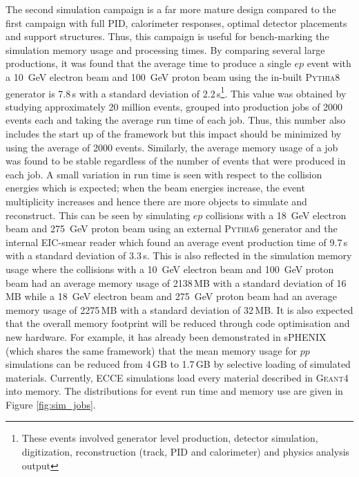 	The second simulation campaign is a far more mature design compared to the first campaign with full PID, calorimeter responses, optimal detector placements and support structures. Thus, this campaign is useful for bench-marking the simulation memory usage and processing times. By comparing several large productions, it was found that the average time to produce a single $ep$ event with a 10~GeV electron beam and 100~GeV proton beam using the in-built \textsc{Pythia8} generator is 7.8\,s with a standard deviation of 2.2\,s\footnote{These events involved generator level production, detector simulation, digitization, reconstruction (track, PID and calorimeter) and physics analysis output}. This value was obtained by studying approximately 20 million events, grouped into production jobs of 2000 events each and taking the average run time of each job. Thus, this number also includes the start up of the framework but this impact should be minimized by using the average of 2000 events. Similarly, the average memory usage of a job was found to be stable regardless of the number of events that were produced in each job. A small variation in run time is seen with respect to the collision energies which is expected; when the beam energies increase, the event multiplicity increases and hence there are more objects to simulate and reconstruct. This can be seen by simulating $ep$ collisions with a 18~GeV electron beam and 275~GeV proton beam using an external \textsc{Pythia6} generator and the internal EIC-smear reader which found an average event production time of 9.7\,s with a standard deviation of 3.3\,s. This is also reflected in the simulation memory usage where the collisions with a 10~GeV electron beam and 100~GeV proton beam had an average memory usage of 2138\,MB with a standard deviation of 16\,MB while a 18~GeV electron beam and 275~GeV proton beam had an average memory usage of 2275\,MB with a standard deviation of 32\,MB. It is also expected that the overall memory footprint will be reduced through code optimisation and new hardware. For example, it has already been demonstrated in sPHENIX (which shares the same framework) that the mean memory usage for $pp$ simulations can be reduced from 4\,GB to 1.7\,GB by selective loading of simulated materials. Currently, ECCE simulations load every material described in \textsc{Geant4} into memory. The distributions for event run time and memory use are given in Figure \ref{fig:sim_jobs}.
	

